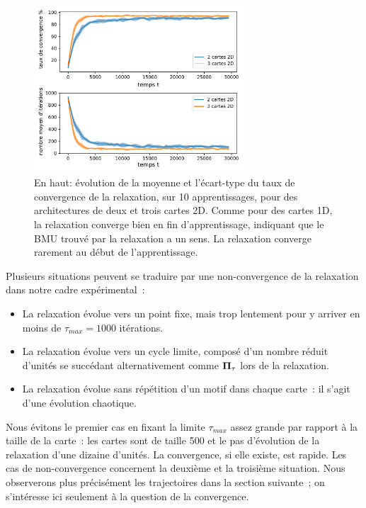 \documentclass[../main]{subfiles}
\begin{document}
\begin{figure}
	\centering
	\includegraphics[width=0.7\textwidth]{2D_conv_evolution_total_french.pdf}
	\caption{En haut: évolution de la moyenne et l'écart-type du taux de convergence de la relaxation, sur 10 apprentissages, pour des architectures de deux et trois cartes 2D. 
	Comme pour des cartes 1D, la relaxation converge bien en fin d'apprentissage, indiquant que le BMU trouvé par la relaxation a un sens. La relaxation converge rarement au début de l'apprentissage.}
	\label{fig:conv_evolution2D}
	\end{figure}

Plusieurs situations peuvent se traduire par une non-convergence de la relaxation dans notre cadre expérimental~:
\begin{itemize}
\item La relaxation évolue vers un point fixe, mais trop lentement pour y arriver en moins de $\tau_{max} = 1000$ itérations.
\item La relaxation évolue vers un cycle limite, composé d'un nombre réduit d'unités se succédant alternativement comme $\mathbf{\Pi_\tau}$ lors de la relaxation.
\item La relaxation évolue sans répétition d'un motif dans chaque carte~: il s'agit d'une évolution chaotique.
\end{itemize}

Nous évitons le premier cas en fixant la limite $\tau_{max}$ assez grande par rapport à la taille de la carte~: les cartes sont de taille 500 et le pas d'évolution de la relaxation d'une dizaine d'unités.
La convergence, si elle existe, est rapide. Les cas de non-convergence concernent la deuxième et la troisième situation. 
Nous observerons plus précisément les trajectoires dans la section suivante~; on s'intéresse ici seulement à la question de la convergence.
\end{document}
